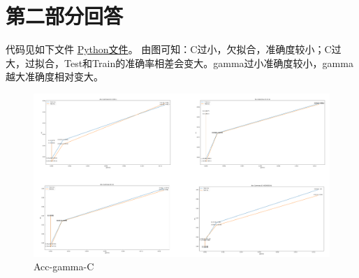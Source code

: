 \documentclass[a4paper,11pt,onecolumn,oneside,UTF8]{article}
\begin{document}
\section*{第二部分回答}

代码见如下文件
\href{https://github.com/Allenem/PatternRecognition/blob/main/hw6/hw_6.py}{Python文件}。
由图可知：C过小，欠拟合，准确度较小；C过大，过拟合，Test和Train的准确率相差会变大。gamma过小准确度较小，gamma越大准确度相对变大。\\
\begin{figure}[H]
    \centering
    \includegraphics[width=\textwidth]{hw6.png}
    \caption{ Acc-gamma-C }
    \label{img1}
\end{figure}
\end{document}

